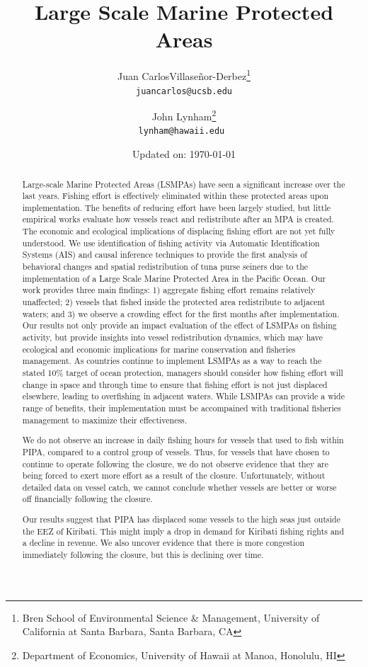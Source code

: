 \documentclass[11pt,english]{article}
\title{Large Scale Marine Protected Areas}
\author{
  Juan CarlosVillase\~{n}or-Derbez\footnote{Bren School of Environmental Science \& Management, University of California at Santa Barbara, Santa Barbara, CA} \\
  \texttt{juancarlos@ucsb.edu}
  \and
 John Lynham\footnote{Department of Economics, University of Hawaii at Manoa, Honolulu, HI}\\
  \texttt{lynham@hawaii.edu }
}
\date{Updated on: \today}
\begin{document}
\maketitle
\begin{abstract}
Large-scale Marine Protected Areas (LSMPAs) have seen a significant
increase over the last years. Fishing effort is effectively eliminated
within these protected areas upon implementation. The benefits of
reducing effort have been largely studied, but little empirical works
evaluate how vessels react and redistribute after an MPA is created. The
economic and ecological implications of displacing fishing effort are
not yet fully understood. We use identification of fishing activity via
Automatic Identification Systems (AIS) and causal inference techniques
to provide the first analysis of behavioral changes and spatial
redistribution of tuna purse seiners due to the implementation of a
Large Scale Marine Protected Area in the Pacific Ocean. Our work
provides three main findings: 1) aggregate fishing effort remains
relatively unaffected; 2) vessels that fished inside the protected area
redistribute to adjacent waters; and 3) we observe a crowding effect for
the first months after implementation. Our results not only provide an
impact evaluation of the effect of LSMPAs on fishing activity, but
provide insights into vessel redistribution dynamics, which may have
ecological and economic implications for marine conservation and fisheries
management. As countries continue to implement LSMPAs as a way to
reach the stated 10\% target of ocean protection, managers should
consider how fishing effort will change in space and through time to
ensure that fishing effort is not just displaced elsewhere, leading to
overfishing in adjacent waters. While LSMPAs can provide a wide
range of benefits, their implementation must be accompained with
traditional fisheries management to maximize their effectiveness.


We do not observe an increase in daily fishing hours for vessels that used to fish within PIPA, compared to a control
group of vessels. Thus, for vessels that have chosen to continue to operate following the closure, we do not observe evidence that they are being forced to exert more effort as a result of the closure. Unfortunately, without detailed data on vessel catch, we cannot conclude whether vessels are better or worse off financially following the closure.

Our results suggest that PIPA has displaced some vessels to the high seas just outside the EEZ of Kiribati. This might imply a drop in demand for Kiribati fishing rights and a decline in revenue. We also uncover evidence that there is more congestion immediately following the closure, but this is declining over time.
\end{abstract}
\end{document}
